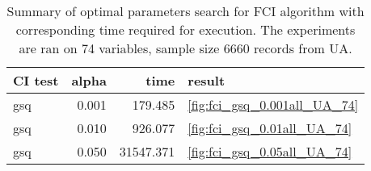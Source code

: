 \begin{table}
\caption{Summary of optimal parameters search for FCI algorithm with corresponding time required for execution. The experiments are ran on 74 variables, sample size 6660 records from UA.}
\label{tab:fci_parameters_time_UA_74_fasholidays}
\begin{tabular}{lrrl}
\toprule
CI test & alpha & time & result \\
\midrule
gsq & 0.001 & 179.485 & \ref{fig:fci_gsq_0.001all_UA_74} \\
gsq & 0.010 & 926.077 & \ref{fig:fci_gsq_0.01all_UA_74} \\
gsq & 0.050 & 31547.371 & \ref{fig:fci_gsq_0.05all_UA_74} \\
\bottomrule
\end{tabular}
\end{table}
